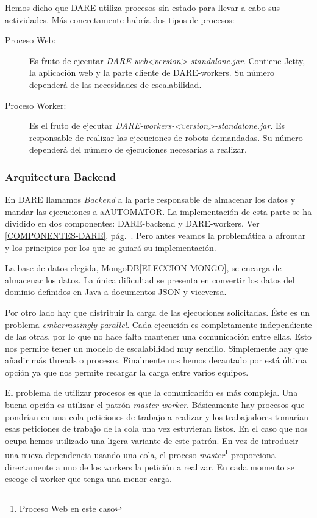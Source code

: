 Hemos dicho que DARE utiliza procesos sin estado para llevar a cabo
sus actividades. Más concretamente habría dos tipos de procesos:
\begin{description}
  \item[Proceso Web:] Es fruto de ejecutar
    \emph{DARE-web<version>-standalone.jar}. Contiene Jetty, la
    aplicación web y la parte cliente de DARE-workers. Su número
    dependerá de las necesidades de escalabilidad.
  \item[Proceso Worker:] Es el fruto de ejecutar
    \emph{DARE-workers-<version>-standalone.jar}. Es responsable de
    realizar las ejecuciones de robots demandadas. Su número dependerá
    del número de ejecuciones necesarias a realizar.
\end{description}

\subsubsection{Arquitectura Backend}

En DARE llamamos \emph{Backend} a la parte responsable de almacenar
los datos y mandar las ejecuciones a aAUTOMATOR. La implementación de
esta parte se ha dividido en dos componentes: DARE-backend y
DARE-workers. Ver \ref{COMPONENTES-DARE},
pág.~\pageref{COMPONENTES-DARE}. Pero antes veamos la problemática a
afrontar y los principios por los que se guiará su implementación.

La base de datos elegida, MongoDB\ref{ELECCION-MONGO}, se encarga de
almacenar los datos. La única dificultad se presenta en convertir los
datos del dominio definidos en Java a documentos JSON y viceversa.

Por otro lado hay que distribuir la carga de las ejecuciones
solicitadas. Éste es un problema \emph{embarrassingly
  parallel}\cite{EMBARRASSINGLY-PARALLEL}. Cada ejecución es
completamente independiente de las otras, por lo que no hace falta
mantener una comunicación entre ellas. Esto nos permite tener un
modelo de escalabilidad muy sencillo. Simplemente hay que añadir más
threads o procesos. Finalmente nos hemos decantado por está última
opción ya que nos permite recargar la carga entre varios equipos.

El problema de utilizar procesos es que la comunicación es más
compleja. Una buena opción es utilizar el patrón
\emph{master-worker}\cite{MASTER-WORKER}. Básicamente hay procesos que
pondrían en una cola peticiones de trabajo a realizar y los
trabajadores tomarían esas peticiones de trabajo de la cola una vez
estuvieran listos. En el caso que nos ocupa hemos utilizado una ligera
variante de este patrón. En vez de introducir una nueva dependencia
usando una cola, el proceso \emph{master}\footnote{Proceso Web en este
  caso} proporciona directamente a uno de los workers la petición a
realizar. En cada momento se escoge el worker que tenga una menor
carga.


